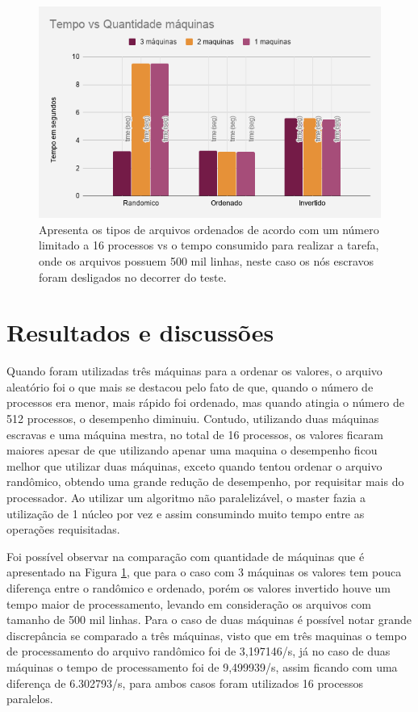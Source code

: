 \documentclass[12pt]{article}
\begin{document}
    \begin{figure}[!htb]
         \centering
         \includegraphics[scale=0.5]{chart/chart4.png}
         \caption{Apresenta os tipos de arquivos ordenados de acordo com um número limitado a 16 processos
         vs o tempo consumido para realizar a tarefa, onde os arquivos possuem 500 mil linhas, neste caso os nós escravos foram desligados no decorrer do teste.}
         \label{img:chart4}
    \end{figure}
   
    
    


\section{Resultados e discussões}

Quando foram utilizadas três máquinas para a ordenar os valores, o arquivo aleatório foi o que mais se destacou pelo fato de que, quando o número de processos era menor, mais rápido foi ordenado, mas quando atingia o número de 512 processos, o desempenho diminuiu. Contudo, utilizando duas máquinas escravas e uma máquina mestra, no total de 16 processos, os valores ficaram maiores apesar de que utilizando apenar uma maquina o desempenho ficou melhor que utilizar duas máquinas, exceto quando tentou ordenar o arquivo randômico, obtendo uma grande redução de desempenho, por requisitar mais do processador. Ao utilizar um algoritmo não paralelizável, o master fazia a utilização de 1 núcleo por vez e assim consumindo muito tempo entre as operações requisitadas.

Foi possível observar na comparação com quantidade de máquinas que é apresentado na Figura \ref{img:chart4}, que para o 
caso com 3 máquinas os valores tem pouca diferença entre o randômico e ordenado, porém os valores invertido houve um tempo maior de processamento, levando em consideração os arquivos com tamanho de 500 mil linhas. Para o caso de duas máquinas é possível notar grande discrepância se comparado a três máquinas, visto que em três maquinas o tempo de processamento do arquivo randômico foi de 3,197146/s, já no caso de duas máquinas o tempo de processamento foi de 9,499939/s, assim ficando com uma diferença de 6.302793/s, para ambos casos foram utilizados 16 processos paralelos.
\end{document}

